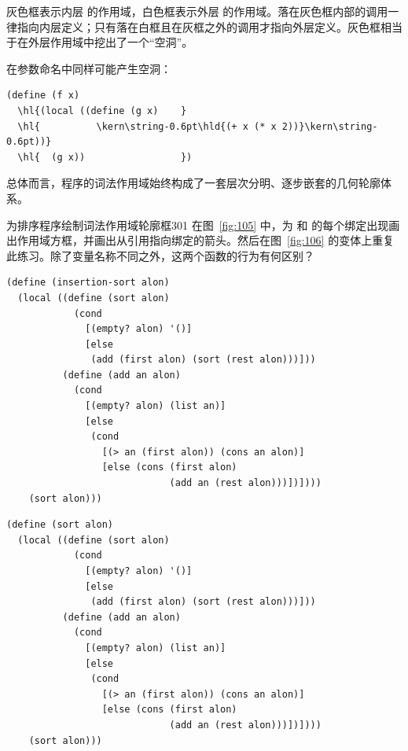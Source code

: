 灰色框表示内层  的作用域，白色框表示外层  的作用域。落在灰色框内部的调用一律指向内层定义；只有落在白框且在灰框之外的调用才指向外层定义。灰色框相当于在外层作用域中挖出了一个“空洞”。

在参数命名中同样可能产生空洞：

\begin{stepperbox}
\begin{Verbatim}[commandchars=\\\{\}, fontsize=\footnotesize]
(define (f x)
  \hl{(local ((define (g x)    }
  \hl{          \kern\string-0.6pt\hld{(+ x (* x 2))}\kern\string-0.6pt))}
  \hl{  (g x))                 })
\end{Verbatim}
\end{stepperbox}

总体而言，程序的词法作用域始终构成了一套层次分明、逐步嵌套的几何轮廓体系。

\begin{exercise}{为排序程序绘制词法作用域轮廓框}{301}
在图~\ref{fig:105} 中，为  和  的每个绑定出现画出作用域方框，并画出从引用指向绑定的箭头。然后在图~\ref{fig:106} 的变体上重复此练习。除了变量名称不同之外，这两个函数的行为有何区别？

\begin{lstlisting}[language=BSL, basicstyle=\scriptsize\ttfamily]
(define (insertion-sort alon)
  (local ((define (sort alon)
            (cond
              [(empty? alon) '()]
              [else
               (add (first alon) (sort (rest alon)))]))
          (define (add an alon)
            (cond
              [(empty? alon) (list an)]
              [else
               (cond
                 [(> an (first alon)) (cons an alon)]
                 [else (cons (first alon)
                             (add an (rest alon)))])])))
    (sort alon)))
\end{lstlisting}
\label{fig:105}

\begin{lstlisting}[language=BSL, basicstyle=\scriptsize\ttfamily]
(define (sort alon)
  (local ((define (sort alon)
            (cond
              [(empty? alon) '()]
              [else
               (add (first alon) (sort (rest alon)))]))
          (define (add an alon)
            (cond
              [(empty? alon) (list an)]
              [else
               (cond
                 [(> an (first alon)) (cons an alon)]
                 [else (cons (first alon)
                             (add an (rest alon)))])])))
    (sort alon)))
\end{lstlisting}
\label{fig:106}
\end{exercise}

